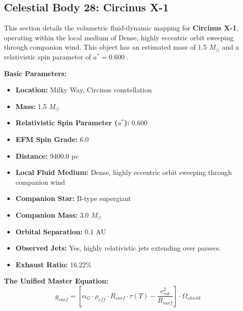 \documentclass[11pt, a4paper]{article}
\begin{document}
\clearpage
\subsection{Celestial Body 28: Circinus X-1}
This section details the volumetric fluid-dynamic mapping for \textbf{Circinus X-1}, operating within the local medium of Dense, highly eccentric orbit sweeping through companion wind. This object has an estimated mass of 1.5 $M_{\odot}$ and a relativistic spin parameter of $a^* = 0.600$ \cite{heinz2015, simbad}.

\vspace{0.5em}
\noindent \textbf{Basic Parameters:}
\begin{itemize}
  \item \textbf{Location:} Milky Way, Circinus constellation
  \item \textbf{Mass:} 1.5 $M_{\odot}$
  \item \textbf{Relativistic Spin Parameter ($a^*$):} 0.600
  \item \textbf{EFM Spin Grade:} 6.0
  \item \textbf{Distance:} 9400.0 pc
  \item \textbf{Local Fluid Medium:} Dense, highly eccentric orbit sweeping through companion wind
  \item \textbf{Companion Star:} B-type supergiant
  \item \textbf{Companion Mass:} 3.0 $M_{\odot}$
  \item \textbf{Orbital Separation:} 0.1 AU
  \item \textbf{Observed Jets:} Yes, highly relativistic jets extending over parsecs.
  \item \textbf{Exhaust Ratio:} 16.22\%
\end{itemize}

\vspace{0.5em}
\noindent \textbf{The Unified Master Equation:}
$$ g_{surf} = \left[ \alpha_G \cdot \rho_{eff} \cdot R_{surf} \cdot \tau(T) - \frac{v_{rot}^2}{R_{surf}} \right] \cdot \Omega_{shield} $$
\end{document}
